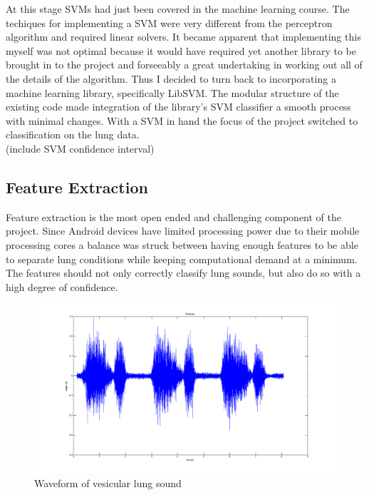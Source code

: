 \documentclass{article}
\begin{document}
At this stage SVMs had just been covered in the machine learning course. The techiques for implementing a SVM were very different from the perceptron algorithm and required linear solvers. It became apparent that implementing this myself was not optimal because it would have required yet another library to be brought in to the project and forseeably a great undertaking in working out all of the details of the algorithm. Thus I decided to turn back to incorporating a machine learning library, specifically LibSVM. The modular structure of the existing code made integration of the library's SVM classifier a smooth process with minimal changes. With a SVM in hand the focus of the project switched to classification on the lung data.\\

(include SVM confidence interval)\\

\subsection{Feature Extraction}

Feature extraction is the most open ended and challenging  component of the project. Since Android devices have limited processing power due to their mobile processing cores a balance was struck between having enough features to be able to separate lung conditions while keeping computational demand at a minimum. The features should not only correctly classify lung sounds, but also do so with a high degree of confidence. \\

\begin{figure}[h!]
	\includegraphics[width=\linewidth]{images/VesicularWaveform.png}
	\caption{Waveform of vesicular lung sound}
 	\label{fig:VesicularWaveform}
\end{figure}
\end{document}
